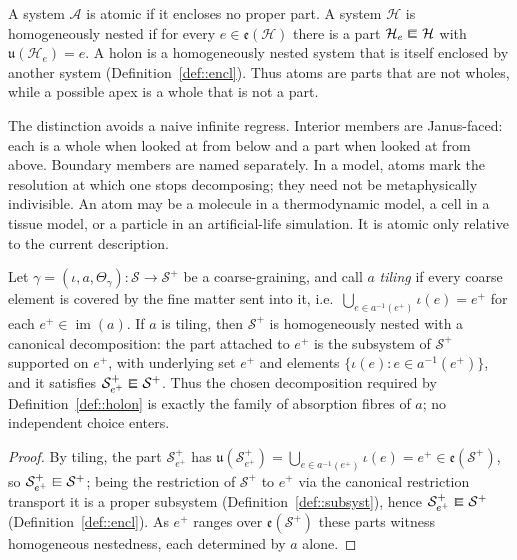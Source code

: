 \documentclass[runningheads]{llncs}
\makeatletter
\newcommand\sqin{\mathrel{\raisebox{0.1ex}{\ooalign{$\sqsubset$\cr $-$}}}}
\newcommand{\superimpose}[2]{{\ooalign{$#1\@firstoftwo#2$\cr\hfil$#1\@secondoftwo#2$\hfil\cr}}}
\newcommand{\encloses}{\mathrel{\mathpalette\superimpose{{\sqsubset}{\hfil{\raisebox{0.09ex}{\scalebox{0.85}[0.7]{$\sqin$}}}}}}}
\newcommand{\encl}{\mathrel{\raisebox{0.1ex}{$\encloses$}}}
\makeatother
\begin{document}
\begin{definition}\label{def::holon}
A system $\mathcal A$ is atomic if it encloses no proper part. A system $\mathcal H$ is homogeneously nested if for every $e\in\mathfrak e(\mathcal H)$ there is a part $\mathcal H_e\encl\mathcal H$ with $\mathfrak u(\mathcal H_e)=e$. A holon is a homogeneously nested system that is itself enclosed by another system (Definition~\ref{def::encl}). Thus atoms are parts that are not wholes, while a possible apex is a whole that is not a part.
\end{definition}

The distinction avoids a naive infinite regress. Interior members are Janus-faced: each is a whole when looked at from below and a part when looked at from above. Boundary members are named separately. In a model, atoms mark the resolution at which one stops decomposing; they need not be metaphysically indivisible. An atom may be a molecule in a thermodynamic model, a cell in a tissue model, or a particle in an artificial-life simulation. It is atomic only relative to the current description.

\begin{lemma}\label{lem::decomp}
Let $\gamma=(\iota,a,\Theta_\gamma):\mathcal S\to\mathcal S^{+}$ be a coarse-graining, and call $a$ \emph{tiling} if every coarse element is covered by the fine matter sent into it, i.e.\ $\bigcup_{e\in a^{-1}(e^{+})}\iota(e)=e^{+}$ for each $e^{+}\in\operatorname{im}(a)$. If $a$ is tiling, then $\mathcal S^{+}$ is homogeneously nested with a canonical decomposition: the part attached to $e^{+}$ is the subsystem of $\mathcal S^{+}$ supported on $e^{+}$, with underlying set $e^{+}$ and elements $\{\iota(e):e\in a^{-1}(e^{+})\}$, and it satisfies $\mathcal S^{+}_{e^{+}}\encl\mathcal S^{+}$. Thus the chosen decomposition required by Definition~\ref{def::holon} is exactly the family of absorption fibres of $a$; no independent choice enters.
\end{lemma}
\begin{proof}
By tiling, the part $\mathcal S^{+}_{e^{+}}$ has $\mathfrak u(\mathcal S^{+}_{e^{+}})=\bigcup_{e\in a^{-1}(e^{+})}\iota(e)=e^{+}\in\mathfrak e(\mathcal S^{+})$, so $\mathcal S^{+}_{e^{+}}\sqin\mathcal S^{+}$; being the restriction of $\mathcal S^{+}$ to $e^{+}$ via the canonical restriction transport it is a proper subsystem (Definition~\ref{def::subsyst}), hence $\mathcal S^{+}_{e^{+}}\encl\mathcal S^{+}$ (Definition~\ref{def::encl}). As $e^{+}$ ranges over $\mathfrak e(\mathcal S^{+})$ these parts witness homogeneous nestedness, each determined by $a$ alone.
\end{proof}
\end{document}
